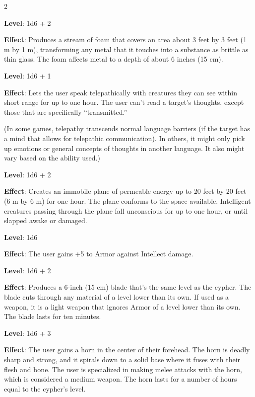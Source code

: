 \begin{multicols}{2}


\textbf{Level}: 1d6 + 2

\textbf{Effect}: Produces a stream of foam that covers an area about 3 feet by 3 feet (1 m by 1 m), transforming any metal that it touches into a substance as brittle as thin glass. The foam affects metal to a depth of about 6 inches (15 cm).


\textbf{Level}: 1d6 + 1

\textbf{Effect}: Lets the user speak telepathically with creatures they can see within short range for up to one hour. The user can’t read a target’s thoughts, except those that are specifically “transmitted.” 

(In some games, telepathy transcends normal language barriers (if the target has a mind that allows for telepathic communication). In others, it might only pick up emotions or general concepts of thoughts in another language. It also might vary based on the ability used.)


\textbf{Level}: 1d6 + 2

\textbf{Effect}: Creates an immobile plane of permeable energy up to 20 feet by 20 feet (6 m by 6 m) for one hour. The plane conforms to the space available. Intelligent creatures passing through the plane fall unconscious for up to one hour, or until slapped awake or damaged.


\textbf{Level}: 1d6

\textbf{Effect}: The user gains +5 to Armor against Intellect damage.


\textbf{Level}: 1d6 + 2

\textbf{Effect}: Produces a 6-inch (15 cm) blade that’s the same level as the cypher. The blade cuts through any material of a level lower than its own. If used as a weapon, it is a light weapon that ignores Armor of a level lower than its own. The blade lasts for ten minutes.


\textbf{Level}: 1d6 + 3

\textbf{Effect}: The user gains a horn in the center of their forehead. The horn is deadly sharp and strong, and it spirals down to a solid base where it fuses with their flesh and bone. The user is specialized in making melee attacks with the horn, which is considered a medium weapon. The horn lasts for a number of hours equal to the cypher’s level.


\end{multicols}
